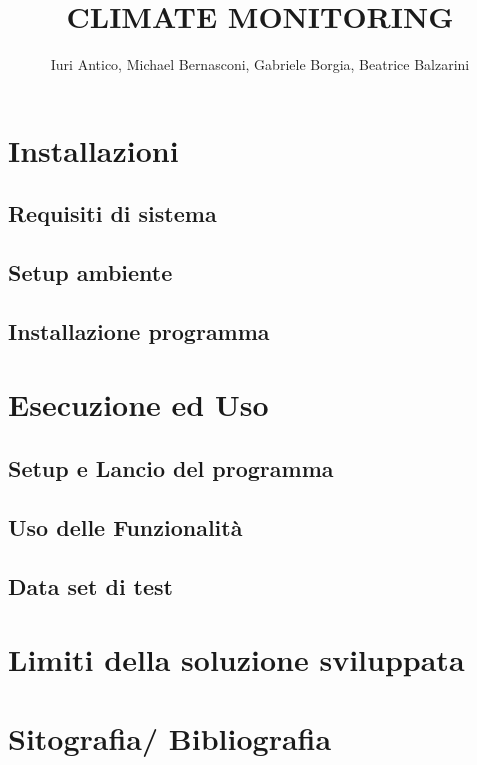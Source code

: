\documentclass[12pt,twoside]{amsart}
\title[1 template]
{CLIMATE MONITORING}
\author{Iuri Antico, Michael Bernasconi, Gabriele Borgia, Beatrice Balzarini}
\begin{document}
	
	
	\maketitle
	
	
	\tableofcontents
	
	\section{Installazioni}
	
		\subsection{Requisiti di sistema}
		
		\subsection{Setup ambiente}
		
		\subsection{Installazione programma}
			
	\section{Esecuzione ed Uso}
	
		\subsection{Setup e Lancio del programma}
		
		\subsection{Uso delle Funzionalità}
		
		\subsection{Data set di test}
		
	\section{Limiti della soluzione sviluppata}
	
	\section{Sitografia/ Bibliografia}
	

		
	
	

	

	

	
	
	
	
	
\end{document}
